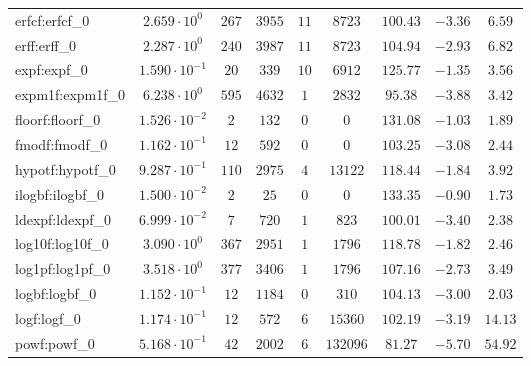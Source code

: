 \begin{tabular}{|l|c|c|c|c|c|c|c|c|}
erfcf:erfcf\_0               & $ 2.659 \cdot 10^{0}  $ & $ 267    $ & $ 3955   $ & $ 11  $ & $ 8723   $ & $ 100.43      $ & $ -3.36   $ & $ 6.59    $ \\
erff:erff\_0                 & $ 2.287 \cdot 10^{0}  $ & $ 240    $ & $ 3987   $ & $ 11  $ & $ 8723   $ & $ 104.94      $ & $ -2.93   $ & $ 6.82    $ \\
expf:expf\_0                 & $ 1.590 \cdot 10^{-1} $ & $ 20     $ & $ 339    $ & $ 10  $ & $ 6912   $ & $ 125.77      $ & $ -1.35   $ & $ 3.56    $ \\
expm1f:expm1f\_0             & $ 6.238 \cdot 10^{0}  $ & $ 595    $ & $ 4632   $ & $ 1   $ & $ 2832   $ & $ 95.38       $ & $ -3.88   $ & $ 3.42    $ \\
floorf:floorf\_0             & $ 1.526 \cdot 10^{-2} $ & $ 2      $ & $ 132    $ & $ 0   $ & $ 0      $ & $ 131.08      $ & $ -1.03   $ & $ 1.89    $ \\
fmodf:fmodf\_0               & $ 1.162 \cdot 10^{-1} $ & $ 12     $ & $ 592    $ & $ 0   $ & $ 0      $ & $ 103.25      $ & $ -3.08   $ & $ 2.44    $ \\
hypotf:hypotf\_0             & $ 9.287 \cdot 10^{-1} $ & $ 110    $ & $ 2975   $ & $ 4   $ & $ 13122  $ & $ 118.44      $ & $ -1.84   $ & $ 3.92    $ \\
ilogbf:ilogbf\_0             & $ 1.500 \cdot 10^{-2} $ & $ 2      $ & $ 25     $ & $ 0   $ & $ 0      $ & $ 133.35      $ & $ -0.90   $ & $ 1.73    $ \\
ldexpf:ldexpf\_0             & $ 6.999 \cdot 10^{-2} $ & $ 7      $ & $ 720    $ & $ 1   $ & $ 823    $ & $ 100.01      $ & $ -3.40   $ & $ 2.38    $ \\
log10f:log10f\_0             & $ 3.090 \cdot 10^{0}  $ & $ 367    $ & $ 2951   $ & $ 1   $ & $ 1796   $ & $ 118.78      $ & $ -1.82   $ & $ 2.46    $ \\
log1pf:log1pf\_0             & $ 3.518 \cdot 10^{0}  $ & $ 377    $ & $ 3406   $ & $ 1   $ & $ 1796   $ & $ 107.16      $ & $ -2.73   $ & $ 3.49    $ \\
logbf:logbf\_0               & $ 1.152 \cdot 10^{-1} $ & $ 12     $ & $ 1184   $ & $ 0   $ & $ 310    $ & $ 104.13      $ & $ -3.00   $ & $ 2.03    $ \\
logf:logf\_0                 & $ 1.174 \cdot 10^{-1} $ & $ 12     $ & $ 572    $ & $ 6   $ & $ 15360  $ & $ 102.19      $ & $ -3.19   $ & $ 14.13   $ \\
powf:powf\_0                 & $ 5.168 \cdot 10^{-1} $ & $ 42     $ & $ 2002   $ & $ 6   $ & $ 132096 $ & $ 81.27       $ & $ -5.70   $ & $ 54.92   $ \\

\end{tabular}
